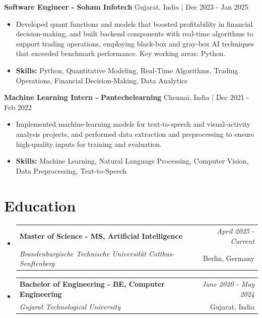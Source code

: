 \documentclass[a4paper,11pt]{article}
\makeatletter
\newcommand{\resumeSubheading}[4]{
\vspace{0.5mm}\item
    \begin{tabular*}{\linewidth}[t]{l@{\extracolsep{\fill}}r}
        \textbf{#1} & \textit{\footnotesize{#4}} \\
        \textit{\footnotesize{#3}} &  \footnotesize{#2}\\
    \end{tabular*}
    \vspace{-2.4mm}
}
\makeatother
\begin{document}
\vspace{1mm}
  \textbf{Software Engineer - Soham Infotech} \hfill Gujarat, India | Dec 2023 - Jan 2025
\vspace{-1.5mm} %
\begin{itemize}
  \item Developed quant functions and models that boosted profitability in financial decision-making, and built backend components with real-time algorithms to support trading operations, employing black-box and gray-box AI techniques that exceeded benchmark performance. Key working areas: Python.

\vspace{-2mm}
  \item \textbf{Skills:} Python, Quantitative Modeling, Real-Time Algorithms, Trading Operations, Financial Decision-Making, Data Analytics
\end{itemize}

\vspace{1mm}
  \textbf{Machine Learning Intern - Pantechelearning} \hfill Chennai, India | Dec 2021 - Feb 2022
\vspace{-1.5mm} %
\begin{itemize}
  \item Implemented machine-learning models for text-to-speech and visual-activity analysis projects, and performed data extraction and preprocessing to ensure high-quality inputs for training and evaluation.
\vspace{-2mm}
  \item \textbf{Skills:} Machine Learning, Natural Language Processing, Computer Vision, Data Preprocessing, Text-to-Speech
\end{itemize}\section{\textbf{Education}}
\vspace{-0.4mm}

\begin{itemize}[leftmargin=0.15in, label={}]
\resumeSubheading
{Master of Science - MS, Artificial Intelligence }{Berlin, Germany}
{Brandenburgische Technische Universität Cottbus-Senftenberg  }{April 2025 - Current}

\vspace{1.0mm} %
\resumeSubheading
{Bachelor of Engineering - BE, Computer Engineering  }{Gujarat, India}
{Gujarat Technological University }{June 2020 - May 2024}

\end{itemize}
\end{document}
